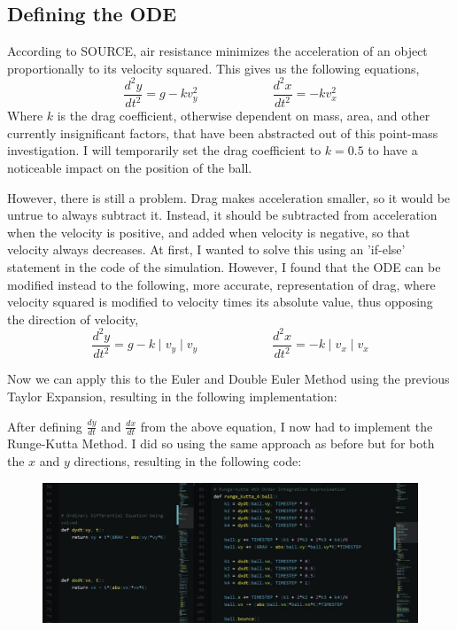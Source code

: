\documentclass[12pt]{article}
\begin{document}
\subsection{Defining the ODE}
According to SOURCE, air resistance minimizes the acceleration of an object proportionally to its velocity squared. This gives us the following equations, 
$$\frac{d^2y}{dt^2} = g - kv_y^2 \qquad \qquad \qquad \frac{d^2x}{dt^2} = - kv_x^2$$
Where $k$ is the drag coefficient, otherwise dependent on mass, area, and other currently insignificant factors, that have been abstracted out of this point-mass investigation. I will temporarily set the drag coefficient to $k=0.5$ to have a noticeable impact on the position of the ball.

However, there is still a problem. Drag makes acceleration smaller, so it would be untrue to always subtract it. Instead, it should be subtracted from acceleration when the velocity is positive, and added when velocity is negative, so that velocity always decreases. At first, I wanted to solve this using an 'if-else' statement in the code of the simulation. However, I found that the ODE can be modified instead to the following, more accurate, representation of drag, where velocity squared is modified to velocity times its absolute value, thus opposing the direction of velocity, 
$$\frac{d^2y}{dt^2} = g - k \mid v_y \mid v_y \qquad \qquad \qquad \frac{d^2x}{dt^2} = - k \mid v_x \mid v_x$$

Now we can apply this to the Euler and Double Euler Method using the previous Taylor Expansion, resulting in the following implementation: 



After defining $\frac{dy}{dt}$ and $\frac{dx}{dt}$ from the above equation, I now had to implement the Runge-Kutta Method. I did so using the same approach as before but for both the $x$ and $y$ directions, resulting in the following code: 

\begin{figure}[H]
\centering
\includegraphics[width=500pt]{img/RK4_code.jpg}
\caption{\label{fig:1}}
\end{figure}
\end{document}
